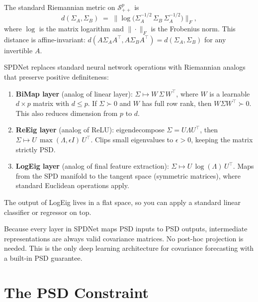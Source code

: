 \begin{definition}
The standard Riemannian metric on $\mathcal{S}_{++}^p$ is
\[
  d(\Sigma_A, \Sigma_B)
  \;=\; \bigl\|\log\bigl(\Sigma_A^{-1/2}\,\Sigma_B\,\Sigma_A^{-1/2}\bigr)\bigr\|_F,
\]
where $\log$ is the matrix logarithm and $\|\cdot\|_F$ is the Frobenius norm.
This distance is affine-invariant: $d(A\Sigma_A A^\top, A\Sigma_B A^\top) =
d(\Sigma_A, \Sigma_B)$ for any invertible $A$.
\end{definition}

\begin{keyidea}[SPDNet]
SPDNet replaces standard neural network operations with Riemannian analogs that
preserve positive definiteness:
\begin{enumerate}[nosep]
  \item \textbf{BiMap layer} (analog of linear layer):
        $\Sigma \mapsto W\,\Sigma\, W^\top$, where $W$ is a learnable
        $d \times p$ matrix with $d \leq p$. If $\Sigma \succ 0$ and $W$ has
        full row rank, then $W\Sigma W^\top \succ 0$. This also reduces
        dimension from $p$ to $d$.
  \item \textbf{ReEig layer} (analog of ReLU):
        eigendecompose $\Sigma = U\Lambda U^\top$, then
        $\Sigma \mapsto U\,\max(\Lambda, \epsilon I)\, U^\top$. Clips small
        eigenvalues to $\epsilon > 0$, keeping the matrix strictly PSD.
  \item \textbf{LogEig layer} (analog of final feature extraction):
        $\Sigma \mapsto U\,\log(\Lambda)\,U^\top$. Maps from the SPD manifold
        to the tangent space (symmetric matrices), where standard Euclidean
        operations apply.
\end{enumerate}
The output of LogEig lives in a flat space, so you can apply a standard linear
classifier or regressor on top.
\end{keyidea}

\begin{keyresult}
Because every layer in SPDNet maps PSD inputs to PSD outputs, intermediate
representations are always valid covariance matrices. No post-hoc projection
is needed. This is the only deep learning architecture for covariance
forecasting with a built-in PSD guarantee.
\end{keyresult}


\section{The PSD Constraint}\label{sec:multivariate:psd}


